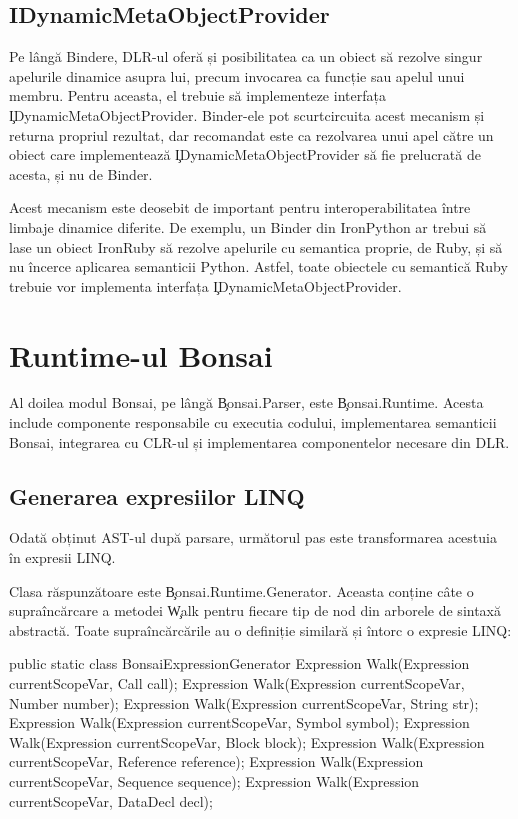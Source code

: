 \documentclass[12pt,a4paper]{memoir}
\begin{document}
\section{IDynamicMetaObjectProvider}\label{sec:IDynamicMetaObjectProvider}

Pe lângă Bindere, DLR-ul oferă și posibilitatea ca un obiect să rezolve singur apelurile dinamice asupra lui, precum invocarea ca funcție sau apelul unui membru. Pentru aceasta, el trebuie să implementeze interfața \\ \c{IDynamicMetaObjectProvider}\cite{i_dynamic_meta_object_provider}. Binder-ele pot scurtcircuita acest mecanism și returna propriul rezultat, dar recomandat este ca rezolvarea unui apel către un obiect care implementează \c{IDynamicMetaObjectProvider} să fie prelucrată de acesta, și nu de Binder.

Acest mecanism este deosebit de important pentru interoperabilitatea între limbaje dinamice diferite. De exemplu, un Binder din IronPython ar trebui să lase un obiect IronRuby să rezolve apelurile cu semantica proprie, de Ruby, și să nu încerce aplicarea semanticii Python. Astfel, toate obiectele cu semantică Ruby trebuie vor implementa interfața \c{IDynamicMetaObjectProvider}.

\chapter{Runtime-ul Bonsai}

Al doilea modul Bonsai, pe lângă \c{Bonsai.Parser}, este \c{Bonsai.Runtime}. Acesta include componente responsabile cu executia codului, implementarea semanticii Bonsai, integrarea cu CLR-ul și implementarea componentelor necesare din DLR.

\section{Generarea expresiilor LINQ}

Odată obținut AST-ul după parsare, următorul pas este transformarea acestuia în expresii LINQ\cite{linq_expressions}. 

Clasa răspunzătoare este \c{Bonsai.Runtime.Generator}. Aceasta conține câte o supraîncărcare a metodei \c{Walk} pentru fiecare tip de nod din arborele de sintaxă abstractă. Toate supraîncărcările au o definiție similară și întorc o expresie LINQ:
\begin{code}
public static class BonsaiExpressionGenerator {
  Expression Walk(Expression currentScopeVar, Call call);       
  Expression Walk(Expression currentScopeVar, Number number);
  Expression Walk(Expression currentScopeVar, String str);
  Expression Walk(Expression currentScopeVar, Symbol symbol);
  Expression Walk(Expression currentScopeVar, Block block);
  Expression Walk(Expression currentScopeVar, Reference reference);
  Expression Walk(Expression currentScopeVar, Sequence sequence);
  Expression Walk(Expression currentScopeVar, DataDecl decl);
}
\end{code}
\end{document}
